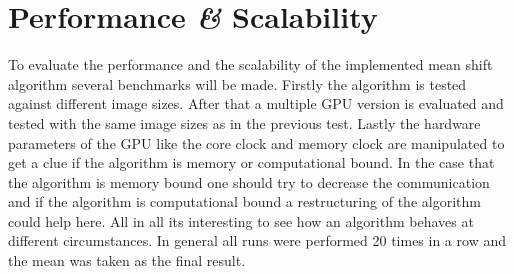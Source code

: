 \chapter{Performance {\itshape{\&}} Scalability} %
\label{cha:performance_and_scalability_}


To evaluate the performance and the scalability of the implemented mean shift
algorithm several benchmarks will be made. Firstly the algorithm is tested 
against different image sizes. After that a multiple \gls{GPU} version is 
evaluated and tested with the same image sizes as in the previous test. Lastly
the hardware parameters of the \gls{GPU} like the core clock and memory clock
are manipulated to get a clue if the algorithm is memory or computational bound. 
In the case that the algorithm is memory bound one should try to decrease the
communication and if the algorithm is computational bound a restructuring of 
the algorithm could help here. All in all its interesting to see how an algorithm
behaves at different circumstances. In general all runs were performed 20 times
in a row and the mean was taken as the final result.


